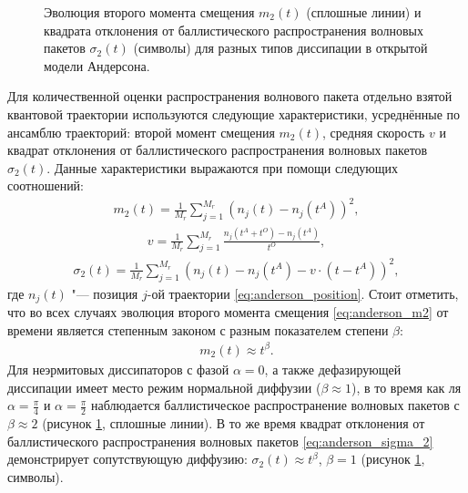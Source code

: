\begin{figure}[h]
	\caption[Характеристика динамики квантовых траекторий на квантовых аттракторах]{
		Эволюция второго момента смещения \(m_2(t)\) (сплошные линии) и квадрата отклонения от баллистического распространения волновых пакетов \(\sigma_2(t)\) (символы) для разных типов диссипации в открытой модели Андерсона.
	}
	\label{fig:anderson_prb_3}
\end{figure}

Для количественной оценки распространения волнового пакета отдельно взятой квантовой траектории используются следующие характеристики, усреднённые по ансамблю траекторий: второй момент смещения \(m_2(t)\), средняя скорость \(v\) и квадрат отклонения от баллистического распространения волновых пакетов \(\sigma_2(t)\). Данные характеристики выражаются при помощи следующих соотношений:
\begin{equation}
	\label{eq:anderson_m2}
	\begin{gathered}
		m_2(t) = \frac{1}{M_r} \sum_{j=1}^{M_r} \left( n_j(t) - n_j(t^A) \right)^2,
	\end{gathered}
\end{equation}
\begin{equation}
	\label{eq:anderson_velocity}
	\begin{gathered}
		v = \frac{1}{M_r} \sum_{j=1}^{M_r} \frac{n_j(t^A + t^O) - n_j(t^A)}{t^O},
	\end{gathered}
\end{equation}
\begin{equation}
	\label{eq:anderson_sigma_2}
	\begin{gathered}
		\sigma_2(t) = \frac{1}{M_r} \sum_{j=1}^{M_r} \left( n_j(t) - n_j(t^A) - v \cdot (t-t^A) \right)^2,
	\end{gathered}
\end{equation}
где \(n_j(t)\) "--- позиция \(j\)-ой траектории \cref{eq:anderson_position}. Стоит отметить, что во всех случаях эволюция второго момента смещения \cref{eq:anderson_m2} от времени является степенным законом с разным показателем степени \(\beta\):
\begin{equation}
	\label{eq:anderson_m2_fit}
	\begin{gathered}
		m_2(t) \approx t^\beta .
	\end{gathered}
\end{equation}
Для неэрмитовых диссипаторов с фазой \(\alpha=0\), а также дефазирующей диссипации имеет место режим нормальной диффузии (\(\beta \approx 1\)), в то время как ля \(\alpha=\frac{\pi}{4}\) и \(\alpha=\frac{\pi}{2}\) наблюдается баллистическое распространение волновых пакетов с \(\beta \approx 2\) (рисунок \cref{fig:anderson_prb_3}, сплошные линии). В то же время квадрат отклонения от баллистического распространения волновых пакетов \cref{eq:anderson_sigma_2} демонстрирует сопутствующую диффузию: \(\sigma_2(t) \approx t^\beta\), \(\beta=1\) (рисунок \cref{fig:anderson_prb_3}, символы).

